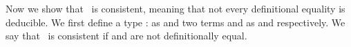 Now we show that \GTT\ is consistent, meaning that
not every definitional equality is deducible. 
We first define a type  :   as  and two terms  and  as  and  respectively.
We say that \GTT\ is consistent if  and  are not definitionally equal.
\begin{code}%
\>[0]\AgdaSpace{}%
\AgdaSymbol{:}\AgdaSpace{}%
\<%
\\
\>[0]\AgdaSpace{}%
\AgdaSymbol{=}\AgdaSpace{}%
\AgdaSpace{}%
\AgdaSpace{}%
\AgdaSpace{}%
\AgdaSpace{}%
\<%
\end{code}


